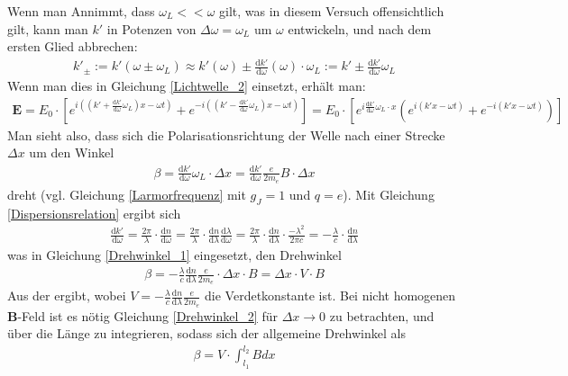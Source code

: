 \documentclass[12pt,a4paper]{article}
\begin{document}
Wenn man Annimmt, dass $\omega_L << \omega$ gilt, was in diesem Versuch offensichtlich gilt, kann man $k'$ in Potenzen von $\Delta \omega = \omega_L$
um $\omega$ entwickeln, und nach dem ersten Glied abbrechen:
\begin{align*}
k'_{\pm} := k'(\omega \pm \omega_L) \approx k'(\omega) \pm \frac{\text{d} k'}{\text{d} \omega}(\omega)\cdot\omega_L := k' \pm \frac{\text{d}k'}{\text{d}\omega}\omega_L
\end{align*}
Wenn man dies in Gleichung \ref{Lichtwelle_2} einsetzt, erhält man:
\begin{align}
\textbf{E} = E_0\cdot[e^{i((k'+ \frac{\text{d} k'}{\text{d} \omega}\omega_L) x - \omega t)}+e^{-i((k' - \frac{\text{d} k'}{\text{d} \omega}\omega_L) x - \omega t)}] = E_0\cdot[e^{i\frac{\text{d} k'}{\text{d} \omega}\omega_L \cdot x}(e^{i(k' x - \omega t)}+e^{-i(k' x - \omega t)})]
\label{Lichtwelle_3}
\end{align}
Man sieht also, dass sich die Polarisationsrichtung der Welle nach einer Strecke $\Delta x$ um den Winkel
\begin{align}
\beta = \frac{\text{d} k'}{\text{d} \omega}\omega_L\cdot \Delta x = \frac{\text{d} k'}{\text{d} \omega}\frac{e}{2m_e}B\cdot \Delta x
\label{Drehwinkel_1}
\end{align}
dreht (vgl. Gleichung \ref{Larmorfrequenz} mit $g_J = 1$ und $ q = e $).
Mit Gleichung \ref{Dispersionsrelation} ergibt sich
\begin{align}
\frac{\text{d} k'}{\text{d} \omega} = \frac{2\pi}{\lambda}\cdot\frac{\text{d} n}{\text{d} \omega} = \frac{2\pi}{\lambda}\cdot\frac{\text{d} n}{\text{d} \lambda}\frac{\text{d} \lambda}{\text{d} \omega} = \frac{2\pi}{\lambda}\cdot \frac{\text{d} n}{\text{d} \lambda} \cdot \frac{-\lambda^2}{2\pi c} = -\frac{\lambda}{c} \cdot \frac{\text{d} n}{\text{d} \lambda}
\end{align}
was in Gleichung \ref{Drehwinkel_1} eingesetzt, den Drehwinkel
\begin{align}
\beta = -\frac{\lambda}{c} \frac{\text{d} n}{\text{d} \lambda}\frac{e}{2m_e}\cdot\Delta x\cdot B = \Delta x \cdot V \cdot B
\label{Drehwinkel_2}
\end{align}Aus der 
ergibt, wobei $V =  -\frac{\lambda}{c} \frac{\text{d} n}{\text{d} \lambda}\frac{e}{2m_e}$ die Verdetkonstante ist.
Bei nicht homogenen \textbf{B}-Feld ist es nötig Gleichung \ref{Drehwinkel_2} für $\Delta x \rightarrow 0$ zu betrachten, und über die Länge zu integrieren, sodass sich der allgemeine Drehwinkel als
\begin{align}
\beta = V \cdot \int_{l_1}^{l_2} B dx
\end{align}
\end{document}
